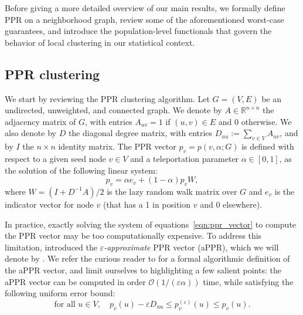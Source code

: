 \documentclass[11pt,twoside]{article}
\newcommand{\Reals}{\mathbb{R}}
\newcommand{\1}{\mathbf{1}}
\begin{document}
Before giving a more detailed overview of our main results, we formally define PPR on a neighborhood graph, review some of the aforementioned worst-case guarantees, and introduce the population-level functionals that govern the behavior of local clustering in our statistical context. 

\subsection{PPR clustering}
\label{subsec:ppr_clustering}
We start by reviewing the PPR clustering algorithm. Let $G = (V,E)$ be an undirected, unweighted, and connected graph. We denote by $A \in \Reals^{n \times n}$ the adjacency
matrix of $G$, with entries $A_{uv} = 1$ if $(u,v) \in E$ and $0$ otherwise.  We
also denote by $D$ the diagonal degree matrix, with entries $D_{uu} :=
\sum_{v \in V} A_{uv}$, and by $I$ the $n \times n$ identity matrix. The PPR vector $p_v = p(v,\alpha;G)$ is defined with respect to a given seed node $v \in V$ and a teleportation parameter $\alpha \in [0,1]$, as the solution of the following linear system:
\begin{equation}
\label{eqn:ppr_vector}
p_v = \alpha e_{v} + (1 - \alpha) p_v W,
\end{equation}
where $W = (I + D^{-1}A)/2$ is the lazy random walk matrix over
$G$ and $e_{v}$ is the indicator vector for node $v$ (that has a 1 in
position $v$ and 0 elsewhere). 

In practice, exactly solving the system of equations~\eqref{eqn:ppr_vector} to compute the PPR vector may be too computationally expensive. To address this limitation, \citet{andersen2006} introduced the \emph{$\varepsilon$-approximate} PPR vector (aPPR), which we will denote by . We refer the curious reader to \citet{andersen2006} for a formal algorithmic definition of the aPPR vector, and limit ourselves to highlighting a few salient points: the aPPR vector can be computed in order $\mathcal{O}(1/(\varepsilon\alpha))$ time, while satisfying the following uniform error bound: 
\begin{equation}
\label{eqn:appr_error}
\textrm{for all $u \in V$}, \quad p_v(u) - \varepsilon D_{uu}\leq
p_v^{(\varepsilon)}(u) \leq p_v(u).  
\end{equation}
\end{document}
